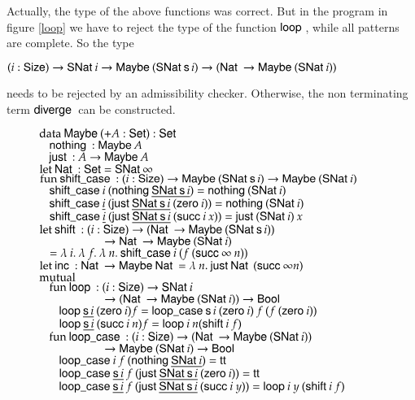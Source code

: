 Actually, the type of the above functions was correct.
But in the \mugda program in figure \ref{loop} we have to reject the 
type of the function $\lop$, while all patterns are complete.
So the type 
\begin{bsp}
$\EPi{i}{\Size}{\SNat i \ra \Maybe (\SNat \s i) \ra (\Nat \ra \Maybe (\SNat i))} $ 
\end{bsp}
needs to be rejected by an admissibility checker.
Otherwise, the non terminating term $\diverge$ can be constructed.
\begin{figure}
$\data \Maybe ( + A : \Set ) : \Set$\\
$\spc  \nothing : \Maybe A$\\
$\spc  \just : A \ra\Maybe A$\\

$\clet \Nat : \Set = \SNat \infty$\\

$\fun \shiftcase : (i : \Size) \ra\Maybe (\SNat \s i) \ra\Maybe (\SNat i)$\\
$\spc \shiftcase i \: (\nothing \inacc{\SNat \s i}) = \nothing (\SNat i)$\\
$\spc \shiftcase \inacc{i} \: (\just \inacc{\SNat \s i} \: (\zero i)) = \nothing (\SNat i)$\\
$\spc \shiftcase \inacc{i} \: (\just \inacc{\SNat \s i} \: (\suc i \: x)) = \just (\SNat i) \: x$\\

$\clet \shift : (i : \Size) \ra(\Nat \ra \Maybe (\SNat \s i)) $\\
$\spcx \spcx \ra\Nat \ra \Maybe (\SNat i) $\\ 
$\spc = \lam{i}{\lam{f}{\lam{n}{\shiftcase i \: (f \: (\suc \infty \: n))}}}$\\

$\clet \inc : \Nat \ra \Maybe \Nat = \lam{n}{\just \Nat \: (\suc \infty n)}$\\

$\mutual$\\
$\spc \fun \lop : (i : \Size ) \ra \SNat i $\\
$\spcx \spcx \ra (\Nat \ra\Maybe (\SNat i)) \ra\Bool$\\
$\spc \spc \lop \inacc{\s i} \: (\zero i) f = \lopcase \s i \: (\zero i) \: f \: (f \: (\zero i))$\\
$\spc \spc \lop \inacc{\s i} \: (\suc i \: n) f = \lop i \: n (\shift i \: f)$\\

$\spc \fun \lopcase : (i : \Size ) \ra (\Nat \ra \Maybe (\SNat i)) $\\
$\spcx \spcx \ra \Maybe (\SNat i) \ra\Bool$\\
$\spc \spc \lopcase i \: f \: (\nothing \inacc{\SNat i}) = \ttt $\\
$\spc \spc \lopcase \inacc{\s i} \: f \: (\just \inacc{\SNat \s i} \: (\zero i)) = \ttt $\\
$\spc \spc \lopcase \inacc{\s i} \: f \: (\just \inacc{\SNat \s i} \: (\suc i \: y)) = \lop i \: y \: (\shift i \:f) $\\


\end{figure}
